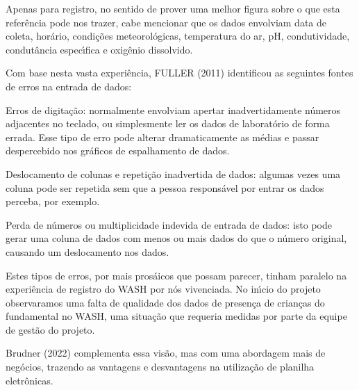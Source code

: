 \documentclass[
12pt,		%
openright,	%
twoside,  %
a4paper,			%
chapter=TITLE,		%
english,			%
french,				%
spanish,			%
brazil				%
]{USPSC-classe/USPSC_RedarTex}
\begin{document}
Apenas para registro, no sentido de prover uma melhor figura sobre o que esta refer\^encia pode nos trazer, cabe mencionar que os dados envolviam data de coleta, hor\'ario, condi\c{c}\~oes meteorol\'ogicas, temperatura do ar, pH, condutividade, condut\^ancia espec\'{\i}fica e oxig\^enio dissolvido.










Com base nesta vasta experi\^encia,  FULLER (2011) identificou as seguintes fontes de erros na entrada de dados:











\begin{alineas}
\item Erros de digita\c{c}\~ao: normalmente envolviam apertar inadvertidamente n\'umeros adjacentes no teclado, ou simplesmente ler os dados de laborat\'orio de forma errada. Esse tipo de erro pode alterar dramaticamente as m\'edias e passar despercebido nos gr\'aficos de espalhamento de dados.
\item Deslocamento de colunas e repeti\c{c}\~ao inadvertida de dados: algumas vezes uma coluna pode ser repetida sem que a pessoa respons\'avel por entrar os dados perceba, por exemplo.
\item Perda de n\'umeros ou multiplicidade indevida de entrada de dados: isto pode gerar uma coluna de dados com menos ou mais dados do que o n\'umero original, causando um deslocamento nos dados.
\end{alineas}

Estes tipos de erros, por mais pros\'aicos que possam parecer, tinham paralelo na experi\^encia de registro do WASH por n\'os vivenciada. No in\'{\i}cio do projeto observaramos uma falta de qualidade dos dados de presen\c{c}a de crian\c{c}as do fundamental no WASH, uma situa\c{c}\~ao que requeria medidas por parte da equipe de gest\~ao do projeto.










 Brudner (2022) complementa essa vis\~ao, mas com uma abordagem mais de neg\'ocios, trazendo as vantagens e desvantagens na utiliza\c{c}\~ao de planilha eletr\^onicas.
\end{document}
